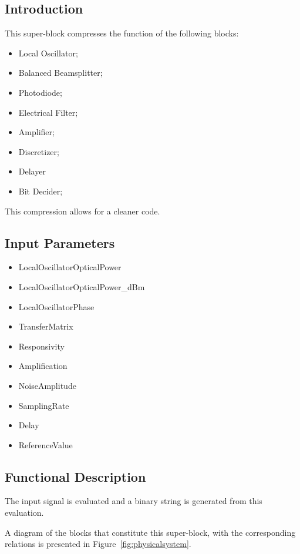 \documentclass[../../sdf/tex/BPSK_system.tex]{subfiles}
\date{}
\begin{document}
\onlyinsubfile{\maketitle}

\subsection*{Introduction}

This super-block compresses the function of the following blocks:
\begin{itemize}
\item Local Oscillator;
\item Balanced Beamsplitter;
\item Photodiode;
\item Electrical Filter;
\item Amplifier;
\item Discretizer;
\item Delayer
\item Bit Decider;
\end{itemize}
\noindent
This compression allows for a cleaner code. 

\subsection*{Input Parameters}

\begin{itemize}
	\item LocalOscillatorOpticalPower
	\item LocalOscillatorOpticalPower\_dBm
	\item LocalOscillatorPhase
	\item TransferMatrix
	\item Responsivity
	\item Amplification
	\item NoiseAmplitude
	\item SamplingRate
	\item Delay
	\item ReferenceValue
\end{itemize}

\subsection*{Functional Description}

The input signal is evaluated and a binary string is generated from this evaluation.
\par
A diagram of the blocks that constitute this super-block, with the corresponding relations is presented in Figure~\ref{fig:physicalsystem}.
\end{document}

